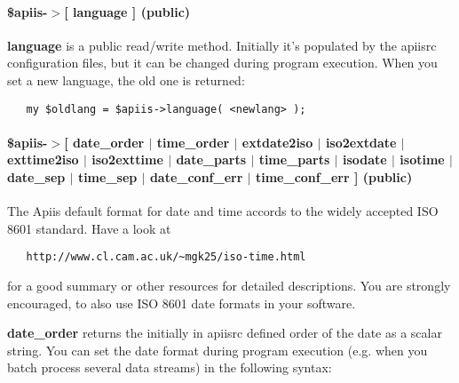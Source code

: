\paragraph*{\$apiis-$>$[ language ] (public)\label{Apiis::Init_--_Basic_initialisation_object_for_the_complete_APIIS_structure__apiis-_language_public_}}


\textbf{language} is a public read/write method. Initially it's populated by the
apiisrc configuration files, but it can be changed during program
execution. When you set a new language, the old one is returned:

\begin{verbatim}
   my $oldlang = $apiis->language( <newlang> );
\end{verbatim}
\paragraph*{\$apiis-$>$[ date\_order $|$ time\_order $|$ extdate2iso $|$ iso2extdate $|$ exttime2iso $|$ iso2exttime $|$ date\_parts $|$ time\_parts $|$ isodate $|$ isotime $|$ date\_sep $|$ time\_sep $|$ date\_conf\_err $|$ time\_conf\_err ] (public)\label{Apiis::Init_--_Basic_initialisation_object_for_the_complete_APIIS_structure__apiis-_date_order_time_order_extdate2iso_iso2extdate_exttime2iso_iso2exttime_date_parts_time_parts_isodate_isotime_date_sep_time_sep_date_conf_err_time_conf_err_public_}}


The Apiis default format for date and time accords to the widely accepted
ISO 8601 standard. Have a look at

\begin{verbatim}
   http://www.cl.cam.ac.uk/~mgk25/iso-time.html
\end{verbatim}


for a good summary or other resources for detailed descriptions. You are
strongly encouraged, to also use ISO 8601 date formats in your software.



\textbf{date\_order} returns the initially in apiisrc defined order of the date as
a scalar string. You can set the date format during program execution (e.g.
when you batch process several data streams) in the following syntax:

